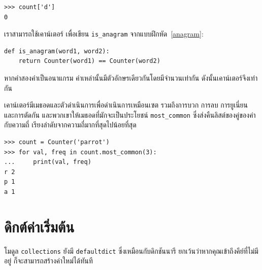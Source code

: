 \begin{verbatim}
>>> count['d']
0
\end{verbatim}

เราสามารถใช้เคาน์เตอร์ เพื่อเขียน \verb"is_anagram" จากแบบฝึกหัด~\ref{anagram}:

\begin{verbatim}
def is_anagram(word1, word2):
    return Counter(word1) == Counter(word2)
\end{verbatim}

หากคำสองคำเป็นอนาแกรม คำเหล่านั้นมีตัวอักษรเดียวกันโดยมีจำนวนเท่ากัน ดังนั้นเคาน์เตอร์จึงเท่ากัน

เคาน์เตอร์มีเมธอดและตัวดำเนินการเพื่อดำเนินการเหมือนเซต รวมถึงการบวก การลบ การยูเนี่ยน และการตัดกัน และพวกเขาให้เมธอดที่มักจะเป็นประโยชน์ 
\verb"most_common" ซึ่งส่งคืนลิสต์ของคู่ของค่ากับความถี่ เรียงลำดับจากความถี่มากที่สุดไปน้อยที่สุด


\begin{verbatim}
>>> count = Counter('parrot')
>>> for val, freq in count.most_common(3):
...     print(val, freq)
r 2
p 1
a 1
\end{verbatim}



\section{ดิกต์ค่าเริ่มต้น} %


โมดูล {\tt collections} ยังมี {\tt defaultdict} ซึ่งเหมือนกับดิกชันนารี ยกเว้นว่าหากคุณเข้าถึงคีย์ที่ไม่มีอยู่ ก็จะสามารถสร้างค่าใหม่ได้ทันที


